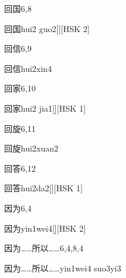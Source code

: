 \begin{entry}{回国}{6,8}
  \begin{phonetics}{回国}{hui2 guo2}[][HSK 2]
  \end{phonetics}
\end{entry}

\begin{entry}{回信}{6,9}
  \begin{phonetics}{回信}{hui2xin4}
  \end{phonetics}
\end{entry}

\begin{entry}{回家}{6,10}
  \begin{phonetics}{回家}{hui2 jia1}[][HSK 1]
  \end{phonetics}
\end{entry}

\begin{entry}{回旋}{6,11}
  \begin{phonetics}{回旋}{hui2xuan2}
  \end{phonetics}
\end{entry}

\begin{entry}{回答}{6,12}
  \begin{phonetics}{回答}{hui2da2}[][HSK 1]
  \end{phonetics}
\end{entry}

\begin{entry}{因为}{6,4}
  \begin{phonetics}{因为}{yin1wei4}[][HSK 2]
  \end{phonetics}
\end{entry}

\begin{entry}{因为……所以……}{6,4,8,4}
  \begin{phonetics}{因为……所以……}{yin1wei4 suo3yi3}
  \end{phonetics}
\end{entry}

